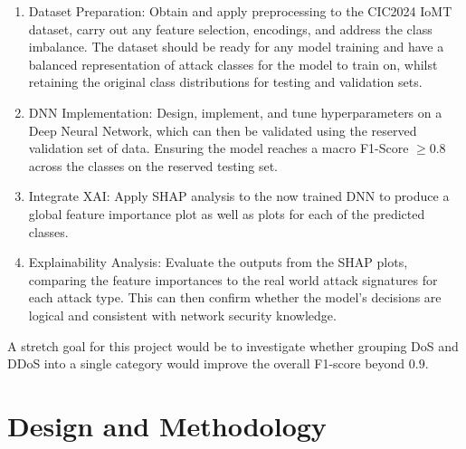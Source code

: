 \documentclass[11pt,a4paper]{article}
\begin{document}
\begin{enumerate}
    \item Dataset Preparation: Obtain and apply preprocessing to the CIC2024 IoMT dataset, carry out any feature selection, encodings, and address the class imbalance. The dataset should be ready for any model training and have a balanced representation of attack classes for the model to train on, whilst retaining the original class distributions for testing and validation sets.
    \item DNN Implementation: Design, implement, and tune hyperparameters on a Deep Neural Network, which can then be validated using the reserved validation set of data. Ensuring the model reaches a macro F1-Score $\geq 0.8$ across the classes on the reserved testing set.
    \item Integrate XAI: Apply SHAP analysis to the now trained DNN to produce a global feature importance plot as well as plots for each of the predicted classes.
    \item Explainability Analysis: Evaluate the outputs from the SHAP plots, comparing the feature importances to the real world attack signatures for each attack type. This can then confirm whether the model’s decisions are logical and consistent with network security knowledge.
\end{enumerate}
A stretch goal for this project would be to investigate whether grouping DoS and DDoS into a single category would improve the overall F1-score beyond $0.9$.


\section{Design and Methodology}
\end{document}
